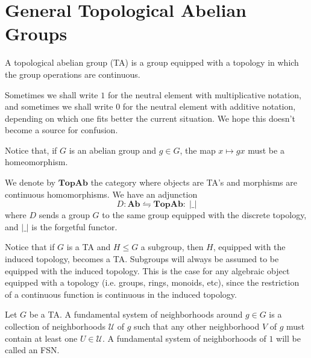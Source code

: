 \section{General Topological Abelian Groups}

\begin{definition} A topological abelian group (TA) is a group equipped with a topology in which the group operations are continuous.
\end{definition}

\begin{remark} Sometimes we shall write $1$ for the neutral element with multiplicative notation, and sometimes we shall write $0$ for the neutral element with additive notation, depending on which one fits better the current situation. We hope this doesn't become a source for confusion.
\end{remark}

\begin{remark}
Notice that, if $G$ is an abelian group and $g \in G$, the map $x \mapsto gx$ must be a homeomorphism.
\end{remark}

\noindent We denote by $\textbf{TopAb}$ the category where objects are TA's and morphisms are continuous homomorphisms. We have an adjunction
\begin{equation}
    D : \textbf{Ab} \leftrightharpoons \textbf{TopAb} : \; | \_ |
\end{equation}
where $D$ sends a group $G$ to the same group equipped with the discrete topology, and $| \_ |$ is the forgetful functor.


\begin{remark} Notice that if $G$ is a TA and $H \leq G$ a subgroup, then $H$, equipped with the induced topology, becomes a TA. Subgroups will always be assumed to be equipped with the induced topology. This is the case for any algebraic object equipped with a topology (i.e. groups, rings, monoids, etc), since the restriction of a continuous function is continuous in the induced topology.
\end{remark}


\begin{definition} Let $G$ be a TA. A fundamental system of neighborhoods around $g \in G$ is a collection of neighborhoods $\mathcal{U}$ of $g$ such that any other neighborhood $V$ of $g$ must contain at least one $U \in \mathcal{U}$. A fundamental system of neighborhoods of $1$ will be called an FSN.
\end{definition}

